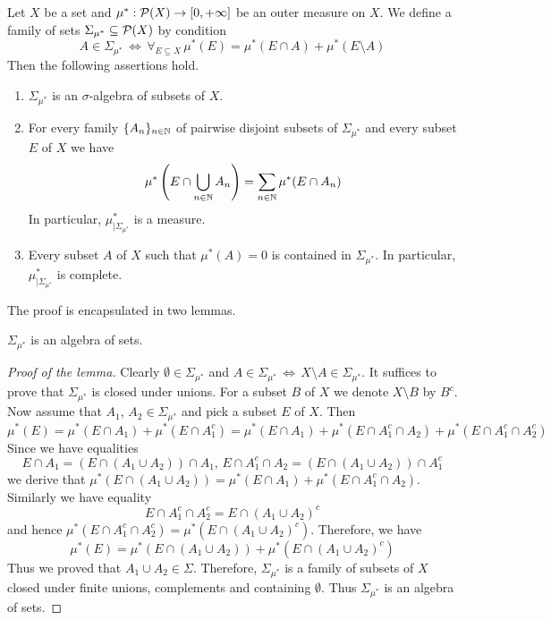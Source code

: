 \begin{theorem}\label{theorem:carath{\'e}odoryconstruction}
Let $X$ be a set and $\mu^*:{\mathcal P}(X)\rightarrow [0,+\infty]$ be an outer measure on $X$. We define a family of sets $\Sigma_{\mu^*}\subseteq {\mathcal P}(X)$ by condition
$$A\in \Sigma_{\mu^*}\,\Leftrightarrow\,\forall_{E\subseteq X}\,\mu^*(E)=\mu^*(E\cap A)+\mu^*(E\setminus A)$$
Then the following assertions hold.
\begin{enumerate}[label=\emph{\textbf{(\arabic*)}}, leftmargin=*]
\item $\Sigma_{\mu^*}$ is an $\sigma$-algebra of subsets of $X$.
\item For every family $\{A_n\}_{n\in {\mathbb N}}$ of pairwise disjoint subsets of $\Sigma_{\mu^*}$ and every subset $E$ of $X$ we have
$$\mu^*\left(E\cap \bigcup_{n\in {\mathbb N}}A_n\right)=\sum_{n\in {\mathbb N}}\mu^*(E\cap A_n)$$
In particular, $\mu^*_{\mid \Sigma_{\mu^*}}$ is a measure.
\item Every subset $A$ of $X$ such that $\mu^*(A)=0$ is contained in $\Sigma_{\mu^*}$. In particular, $\mu^*_{\mid \Sigma_{\mu^*}}$ is complete.
\end{enumerate}
\end{theorem}
\noindent
The proof is encapsulated in two lemmas.

\begin{lemma}\label{lemma:outeralgebra}
$\Sigma_{\mu^*}$ is an algebra of sets.
\end{lemma}
\begin{proof}[Proof of the lemma]
Clearly $\emptyset \in \Sigma_{\mu^*}$ and $A\in \Sigma_{\mu^*}\,\Leftrightarrow\,X\setminus A\in \Sigma_{\mu^*}$. It suffices to prove that $\Sigma_{\mu^*}$ is closed under unions. For a subset $B$ of $X$ we denote $X\setminus B$ by $B^c$. Now assume that $A_1$, $A_2\in \Sigma_{\mu^*}$ and pick a subset $E$ of $X$. Then
$$\mu^*(E)=\mu^*(E\cap A_1)+\mu^*(E\cap A_1^c)=\mu^*(E\cap A_1)+\mu^*(E\cap A_1^c\cap A_2)+\mu^*(E\cap A_1^c\cap A_2^c)$$
Since we have equalities
$$E\cap A_1=\left(E\cap (A_1\cup A_2)\right)\cap A_1,\,E\cap A_1^c\cap A_2=\left(E\cap (A_1\cup A_2)\right)\cap A_1^c$$
we derive that $\mu^*(E\cap (A_1\cup A_2))=\mu^*(E\cap A_1)+\mu^*(E\cap A_1^c\cap A_2)$. Similarly we have equality 
$$E\cap A_1^c\cap A_2^c=E\cap (A_1\cup A_2)^c$$
and hence $\mu^*(E\cap A_1^c\cap A_2^c)=\mu^*(E\cap (A_1\cup A_2)^c)$. Therefore, we have 
$$\mu^*(E)=\mu^*(E\cap (A_1\cup A_2))+\mu^*(E\cap (A_1\cup A_2)^c)$$
Thus we proved that $A_1\cup A_2\in \Sigma$. Therefore, $\Sigma_{\mu^*}$ is a family of subsets of $X$ closed under finite unions, complements and containing $\emptyset$. Thus $\Sigma_{\mu^*}$ is an algebra of sets.
\end{proof}


